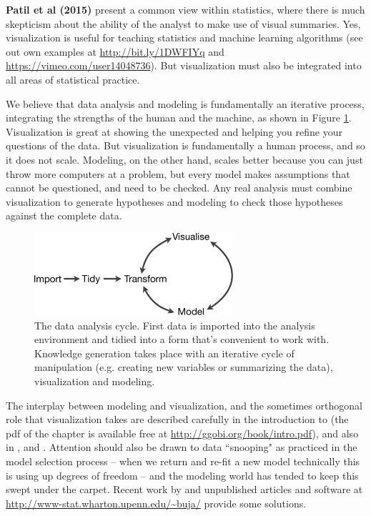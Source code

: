 \documentclass[preprint]{imsart}
\begin{document}

\textbf{Patil et al (2015)} present a common view within statistics, where there is much skepticism about the ability of the analyst to make use of visual summaries. Yes, visualization is useful for teaching statistics and machine learning algorithms (see out own examples at \url{http://bit.ly/1DWFIYq} and \url{https://vimeo.com/user14048736}). But visualization must also be integrated into all areas of statistical practice.

We believe that data analysis and modeling is fundamentally an iterative process, integrating the strengths of the human and the machine, as shown in Figure \ref{fig:cycle}. Visualization is great at showing the unexpected and helping you refine your questions of the data. But visualization is fundamentally a human process, and so it does not scale. Modeling, on the other hand, scales better because you can just throw more computers at a problem, but every model makes assumptions that cannot be questioned, and need to be checked. Any real analysis must combine visualization to generate hypotheses and modeling to check those hypotheses against the complete data.

\begin{figure}[htbp]
  \centering
  \includegraphics[height=1.2in]{cycle-crop}
  \caption{The data analysis cycle. First data is imported into the analysis environment and tidied into a form that's convenient to work with. Knowledge generation takes place with an iterative cycle of manipulation (e.g. creating new variables or summarizing the data), visualization and modeling.}
  \label{fig:cycle}
\end{figure}

The interplay between modeling and visualization, and the sometimes orthogonal role that visualization takes are described carefully in the introduction to \cite{cook:2007} (the pdf of the chapter is available free at \url{http://ggobi.org/book/intro.pdf}), and also in \cite{Ch95}, and \cite{CH90}. Attention should also be drawn to data ``snooping" as practiced in the model selection process -- when we return and re-fit a new model technically this is using up degrees of freedom -- and the modeling world has tended to keep this swept under the carpet. Recent work by \cite{berk:2013} and unpublished articles and software at \url{http://www-stat.wharton.upenn.edu/~buja/} provide some solutions.
\end{document}
